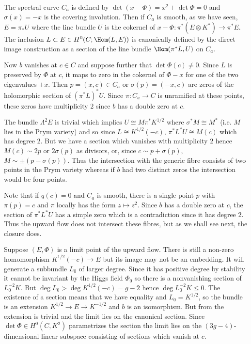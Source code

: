 The spectral curve  $ C_a$ is defined by $\det(x-\Phi)=x^2+\det \Phi=0$ and $\sigma(x)= -x$ is the covering involution. Then if $ C_a$ is smooth, as we have seen, $E=\pi_*U$ where the line
bundle $U$ is the cokernel of $x-\Phi:\pi^*(E\otimes K^*)\rightarrow \pi^*E$. The inclusion $L\subset E\in H^0(C;\Hom(L,E))$ is canonically defined
by the direct image construction as a section of the line bundle $\Hom (\pi^*L,U)$ on $C_a$.

Now $b$ vanishes at  $c\in C$ and suppose further that $\det \Phi(c)\ne 0$. Since  $L$ is preserved by $\Phi$ at $c$, it  maps to zero in the cokernel
of $\Phi-x$ for one of the two eigenvalues $\pm x$. Then $p=(x,c)\in  C_a$ or $\sigma(p)=(-x,c)$ are zeros of the holomorphic section of $(\pi^*L)^*U$.
Since $\pi:C_a\rightarrow C$ is unramified at these points, these zeros have multiplicity $2$ since $b$ has a double zero at $c$.


The bundle $\Lambda^2 E$ is trivial which implies $U\cong M\pi^*K^{1/2}$ where $\sigma^*M\cong M^*$ (i.e. $M$ lies in the Prym variety) and so
since $L\cong K^{1/2}(-c)$, $\pi^*L^* U\cong M(c)$ which has degree $2$. But we have a section which vanishes with multiplicity $2$
hence $M(c)\sim 2p$ or $2\sigma(p)$ as divisors, or, since $c\sim p+\sigma(p)$, $M\sim \pm(p-\sigma(p))$. Thus the
intersection with the generic fibre consists of two points in the Prym variety whereas if $b$ had two distinct zeros the intersection
would be four points.

Note that if $q(c)=0$ and $C_a$ is smooth, there is a single point $p$ with $\pi(p)=c$ and $\pi$ locally has the form $z\mapsto z^2$. Since $b$ has a double zero at $c$, the section of $\pi^*L^* U$ has a simple zero which is a contradiction since it has degree $2$. Thus the upward flow does not intersect these fibres, but as we shall see next, the closure does.

Suppose $(E,\Phi)$ is a limit point of the upward flow. There is still a non-zero homomorphism $K^{1/2}(-c)\rightarrow E$ but its image may not be an
embedding. It will generate a subbundle $L_0$ of larger degree. Since it has positive degree by  stability it cannot be invariant by the Higgs
field $\Phi_0$ so there is a nonvanishing section of $L_0^{-2}K$. But $\deg L_0>\deg K^{1/2}(-c)=g-2$ hence $\deg L_0^{-2}K\le 0$.
The existence of a section means that we have equality and $L_0=K^{1/2}$, so the bundle is an extension $K^{1/2}\rightarrow E\rightarrow
K^{-1/2}$ and $b$ is an isomorphism. But from \cite[Proposition 3.3]{hitchin} the extension is trivial and the limit lies on the canonical section. Since
$\det \Phi\in  H^0(C,K^2)$ parametrizes the section the limit lies on
the $(3g-4)$-dimensional  linear subspace consisting of sections which vanish at $c$.


